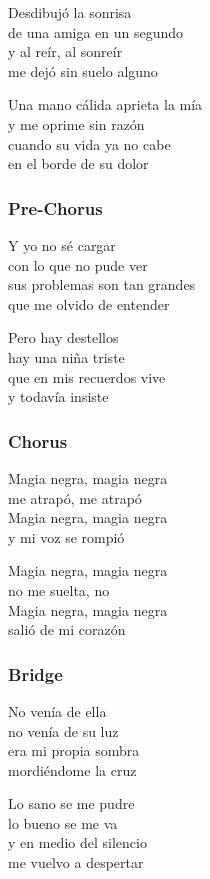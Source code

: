 \documentclass[]{article}
\begin{document}
Desdibujó la sonrisa\\
de una amiga en un segundo\\
y al reír, al sonreír\\
me dejó sin suelo alguno

Una mano cálida aprieta la mía\\
y me oprime sin razón\\
cuando su vida ya no cabe\\
en el borde de su dolor

\subsubsection{Pre-Chorus}\label{pre-chorus-29}

Y yo no sé cargar\\
con lo que no pude ver\\
sus problemas son tan grandes\\
que me olvido de entender

Pero hay destellos\\
hay una niña triste\\
que en mis recuerdos vive\\
y todavía insiste

\subsubsection{Chorus}\label{chorus-46}

Magia negra, magia negra\\
me atrapó, me atrapó\\
Magia negra, magia negra\\
y mi voz se rompió

Magia negra, magia negra\\
no me suelta, no\\
Magia negra, magia negra\\
salió de mi corazón

\subsubsection{Bridge}\label{bridge-12}

No venía de ella\\
no venía de su luz\\
era mi propia sombra\\
mordiéndome la cruz

Lo sano se me pudre\\
lo bueno se me va\\
y en medio del silencio\\
me vuelvo a despertar
\end{document}
